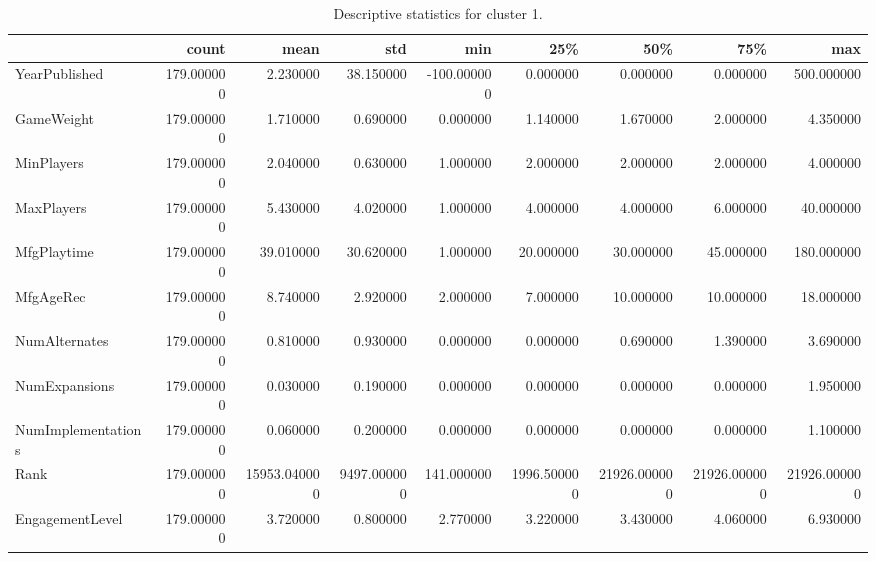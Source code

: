 \begin{table}
\caption{Descriptive statistics for cluster 1.}
\label{tab:cluster_1_describe}
\begin{tabular}{lrrrrrrrr}
\toprule
 & count & mean & std & min & 25\% & 50\% & 75\% & max \\
\midrule
YearPublished & 179.000000 & 2.230000 & 38.150000 & -100.000000 & 0.000000 & 0.000000 & 0.000000 & 500.000000 \\
GameWeight & 179.000000 & 1.710000 & 0.690000 & 0.000000 & 1.140000 & 1.670000 & 2.000000 & 4.350000 \\
MinPlayers & 179.000000 & 2.040000 & 0.630000 & 1.000000 & 2.000000 & 2.000000 & 2.000000 & 4.000000 \\
MaxPlayers & 179.000000 & 5.430000 & 4.020000 & 1.000000 & 4.000000 & 4.000000 & 6.000000 & 40.000000 \\
MfgPlaytime & 179.000000 & 39.010000 & 30.620000 & 1.000000 & 20.000000 & 30.000000 & 45.000000 & 180.000000 \\
MfgAgeRec & 179.000000 & 8.740000 & 2.920000 & 2.000000 & 7.000000 & 10.000000 & 10.000000 & 18.000000 \\
NumAlternates & 179.000000 & 0.810000 & 0.930000 & 0.000000 & 0.000000 & 0.690000 & 1.390000 & 3.690000 \\
NumExpansions & 179.000000 & 0.030000 & 0.190000 & 0.000000 & 0.000000 & 0.000000 & 0.000000 & 1.950000 \\
NumImplementations & 179.000000 & 0.060000 & 0.200000 & 0.000000 & 0.000000 & 0.000000 & 0.000000 & 1.100000 \\
Rank & 179.000000 & 15953.040000 & 9497.000000 & 141.000000 & 1996.500000 & 21926.000000 & 21926.000000 & 21926.000000 \\
EngagementLevel & 179.000000 & 3.720000 & 0.800000 & 2.770000 & 3.220000 & 3.430000 & 4.060000 & 6.930000 \\
\bottomrule
\end{tabular}
\end{table}
